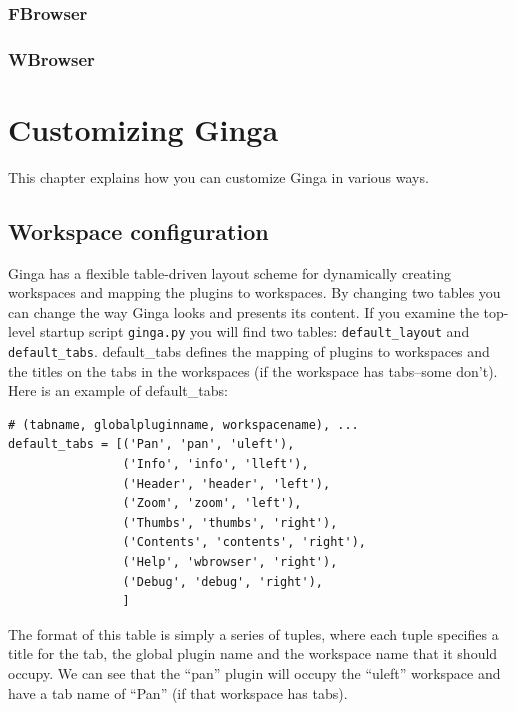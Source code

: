 \documentclass[11pt]{report}
\begin{document}
\subsection{FBrowser}
\subsection{WBrowser}

\chapter{Customizing Ginga}
\label{ch:customizing}
This chapter explains how you can customize Ginga in various ways.

\section{Workspace configuration}
\label{sec:workspaceconfig}
Ginga has a flexible table-driven layout scheme for dynamically creating
workspaces and mapping the plugins to workspaces.  By changing two
tables you can change the way Ginga looks and presents its content. 
If you examine the top-level startup script {\tt ginga.py} you will find
two tables: {\tt default\_layout} and {\tt default\_tabs}.
default\_tabs defines the mapping of plugins to workspaces and the
titles on the tabs in the workspaces (if the workspace has tabs--some
don't).  
Here is an example of default\_tabs:
\begin{lstlisting}
# (tabname, globalpluginname, workspacename), ...
default_tabs = [('Pan', 'pan', 'uleft'),
                ('Info', 'info', 'lleft'),
                ('Header', 'header', 'left'),
                ('Zoom', 'zoom', 'left'),
                ('Thumbs', 'thumbs', 'right'),
                ('Contents', 'contents', 'right'),
                ('Help', 'wbrowser', 'right'),
                ('Debug', 'debug', 'right'),
                ]
\end{lstlisting}
The format of this table is simply a series of tuples, where each tuple
specifies a title for the tab, the global plugin name and the workspace
name that it should occupy.  We can see that the ``pan'' plugin will
occupy the ``uleft'' workspace and have a tab name of ``Pan'' (if that
workspace has tabs).
\end{document}
